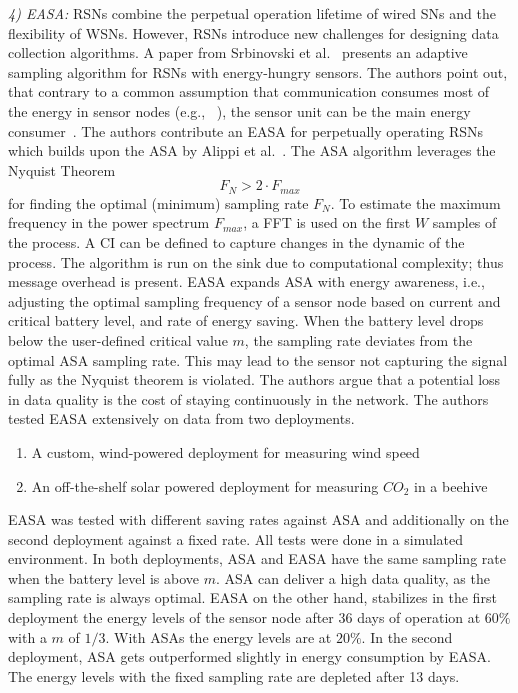 \textit{4) \ac{EASA}:}
\acp{RSN} combine the perpetual operation lifetime of wired \acp{SN} and the
flexibility of \acp{WSN}. However, \acp{RSN} introduce new challenges for
designing data collection algorithms. A paper from Srbinovski et
al.~\cite{srbinovski2016energy} presents an adaptive sampling algorithm for
\acp{RSN} with energy-hungry sensors. The authors point out, that contrary to a
common assumption that communication consumes most of the energy in sensor
nodes (e.g., ~\cite{santini2006adaptive}), the sensor unit can be the main
energy consumer~\cite{boyle2012energy}. The authors contribute an \ac{EASA} for
perpetually operating \acp{RSN} which builds upon the \ac{ASA} by Alippi et
al.~\cite{alippi2007adaptive}. The \ac{ASA} algorithm leverages the Nyquist
Theorem $$ F_N > 2 \cdot F_{max} $$ for finding the optimal (minimum) sampling
rate $ F_N $. To estimate the maximum frequency in the power spectrum $ F_{max}
$, a \ac{FFT} is used on the first $ W $ samples of the process. A \ac{CI} can
be defined to capture changes in the dynamic of the process. The algorithm is
run on the sink due to computational complexity; thus message overhead is
present. \ac{EASA} expands \ac{ASA} with energy awareness, i.e., adjusting the
optimal sampling frequency of a sensor node based on current and critical
battery level, and rate of energy saving. When the battery level drops below
the user-defined critical value $ m $, the sampling rate deviates from the
optimal \ac{ASA} sampling rate. This may lead to the sensor not capturing the
signal fully as the Nyquist theorem is violated. The authors argue that a
potential loss in data quality is the cost of staying continuously in the
network. The authors tested \ac{EASA} extensively on data from two deployments.

\begin{enumerate}
    \item A custom, wind-powered deployment for measuring wind speed
    \item An off-the-shelf solar powered deployment for measuring $ CO_2 $ in a beehive
\end{enumerate}

\ac{EASA} was tested with different saving rates against \ac{ASA} and
additionally on the second deployment against a fixed rate. All tests were done
in a simulated environment. In both deployments, \ac{ASA} and \ac{EASA} have
the same sampling rate when the battery level is above $ m $. \ac{ASA} can
deliver a high data quality, as the sampling rate is always optimal. \ac{EASA}
on the other hand, stabilizes in the first deployment the energy levels of the
sensor node after 36 days of operation at $ 60\% $ with a $ m $ of $ 1/3 $.
With \acp{ASA} the energy levels are at $ 20\% $. In the second deployment,
\ac{ASA} gets outperformed slightly in energy consumption by \ac{EASA}. The
energy levels with the fixed sampling rate are depleted after 13 days.

